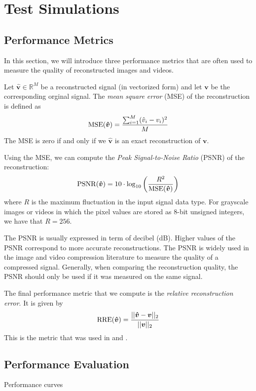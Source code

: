 \chapter{Test Simulations}
\label{ch:results}



\section{Performance Metrics}
In this section, we will introduce three performance metrics that are often used to measure the quality of reconstructed images and videos.

Let $\bm \hat{v} \in\mathbb{R}^M$ be a reconstructed signal (in vectorized form) and let $\bm v$ be the corresponding orginal signal.
The \emph{mean square error} (MSE) of the reconstruction is defined as
\begin{equation*}
  \operatorname*{MSE}(\bm{\hat v}) = \frac{\sum_{i=1}^M (\hat v_i - v_i)^2}{M}
\end{equation*}
The MSE is zero if and only if we $\bm{\hat v}$ is an exact reconstruction of $\bm v$.

Using the MSE, we can compute the \emph{Peak Signal-to-Noise Ratio} (PSNR) of the reconstruction:
\begin{equation*}
  \operatorname*{PSNR}(\bm{\hat v}) = 10 \cdot \log_{10} \left(\frac{R^2}{\operatorname*{MSE}(\bm{\hat v})}\right)
\end{equation*}
where $R$ is the maximum fluctuation in the input signal data type. 
For grayscale images or videos in which the pixel values are stored as 8-bit unsigned integers, we have that $R = 256$.

The PSNR is usually expressed in term of decibel (dB). 
Higher values of the PSNR correspond to more accurate reconstructions.
The PSNR is widely used in the image and video compression literature to measure the quality of a compressed signal.
Generally, when comparing the reconstruction quality, the PSNR should only be used if it was measured on the same signal.

The final performance metric that we compute is the \emph{relative reconstruction error}.
It is given by
\begin{equation*}
  \operatorname*{RRE}(\bm{\hat v}) = \frac{||\bm{\hat v} - \bm v||_2}{||\bm v||_2}
\end{equation*}
This is the metric that was used in \cite{ji2008} and \cite{pilikos2014}.


\section{Performance Evaluation}
Performance curves

